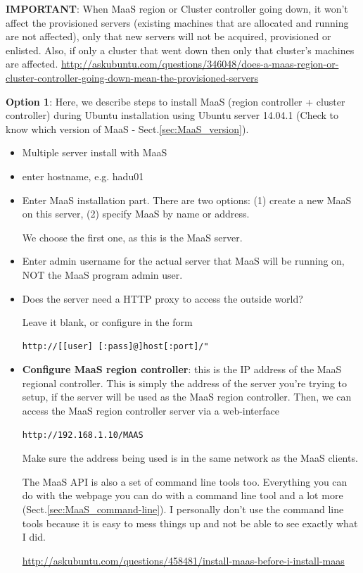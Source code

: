 {\bf IMPORTANT}: When MaaS region or Cluster controller going down, it won't
affect the provisioned servers (existing machines that are allocated and
running are not affected), only that new servers will not be acquired,
provisioned or enlisted. Also, if only a cluster that went down then only that
cluster's machines are affected. 
\url{http://askubuntu.com/questions/346048/does-a-maas-region-or-cluster-controller-going-down-mean-the-provisioned-servers}


{\bf Option 1}:   Here, we describe steps to install MaaS (region controller +
cluster controller) during Ubuntu installation using Ubuntu server 14.04.1
(Check to know which version of MaaS - Sect.\ref{sec:MaaS_version}). 
\begin{itemize}
  \item Multiple server install with MaaS
  \item enter hostname, e.g. hadu01
  \item Enter MaaS installation part. There are two options: (1) create a new
  MaaS on this server, (2) specify MaaS by name or address.
  
  We choose the first one, as this is the MaaS server.
  
  \item Enter admin username for the actual server that MaaS will be running on,
  NOT the MaaS program admin user. 
  
  \item Does the server need a HTTP proxy to access the outside world?
  
  Leave it blank, or configure in the form
\begin{verbatim}
http://[[user] [:pass]@]host[:port]/"
\end{verbatim}
  
  \item {\bf Configure MaaS region controller}: this is the IP address of the
  MaaS regional controller. This is simply the address of the server you're
  trying to setup, if the server will be used as the MaaS region controller.
  Then, we can access the MaaS region controller server via a web-interface
\begin{verbatim}
http://192.168.1.10/MAAS
\end{verbatim}
Make sure the address being used is in the same network as the MaaS clients.    
  
  The MaaS API is also a set of command line tools too. Everything you can do
  with the webpage you can do with a command line tool and a lot more
  (Sect.\ref{sec:MaaS_command-line}).
  I personally don't use the command line tools because it is easy to mess things
  up and not be able to see exactly what I did.  
  
  \url{http://askubuntu.com/questions/458481/install-maas-before-i-install-maas}
  
\end{itemize}

